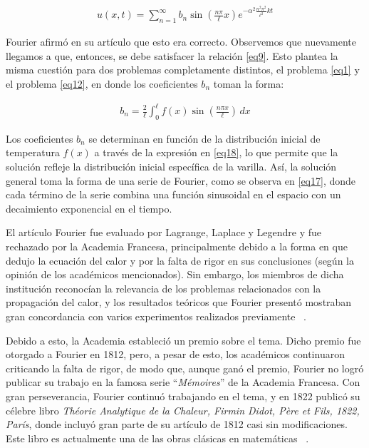  
\begin{equation} \label{eq17}
	\begin{split}
		u(x,t) = \sum_{n=1}^{\infty} b_n \sin \left( \frac{n \pi}{\ell} x \right) e^{- \alpha^2 \frac{n^2 \pi^2}{\ell^2} k t}
	\end{split}
\end{equation}

Fourier afirmó en su artículo que esto era correcto. Observemos que nuevamente llegamos a que, entonces, se debe satisfacer la relación \eqref{eq9}. Esto plantea la misma cuestión para dos problemas completamente distintos, el problema \eqref{eq1} y el problema \eqref{eq12}, en donde los coeficientes  \( b_n \) toman la forma:

\begin{equation} \label{eq18}
	\begin{split}
		b_n = \frac{2}{\ell} \int_0^{\ell} f(x) \sin \left( \frac{n \pi x}{\ell} \right) \, dx
	\end{split}
\end{equation}

Los coeficientes \( b_n \) se determinan en función de la distribución inicial de temperatura \( f(x) \) a través de la expresión en \eqref{eq18}, lo que permite que la solución refleje la distribución inicial específica de la varilla. Así, la solución general toma la forma de una serie de Fourier, como se observa en \eqref{eq17}, donde cada término de la serie combina una función sinusoidal en el espacio con un decaimiento exponencial en el tiempo. \newline

El artículo Fourier fue evaluado por Lagrange, Laplace y Legendre y fue rechazado por la Academia Francesa, principalmente debido a la forma en que dedujo la ecuación del calor y por la falta de rigor en sus conclusiones (según la opinión de los académicos mencionados). Sin embargo, los miembros de dicha institución reconocían la relevancia de los problemas relacionados con la propagación del calor, y los resultados teóricos que Fourier presentó mostraban gran concordancia con varios experimentos realizados previamente ~\cite{historia-alambert-fourier-euler}. 

Debido a esto, la Academia estableció un premio sobre el tema. Dicho premio fue otorgado a Fourier en 1812, pero, a pesar de esto, los académicos continuaron criticando la falta de rigor, de modo que, aunque ganó el premio, Fourier no logró publicar su trabajo en la famosa serie “\textit{Mémoires}” de la Academia Francesa. Con gran perseverancia, Fourier continuó trabajando en el tema, y en 1822 publicó su célebre libro \textit{Théorie Analytique de la Chaleur, Firmin Didot, Père et Fils, 1822, París}, donde incluyó gran parte de su artículo de 1812 casi sin modificaciones. Este libro es actualmente una de las obras clásicas en matemáticas ~\cite{historia-alambert-fourier-euler}.


